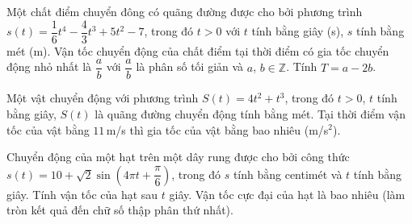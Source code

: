 \begin{ex}%
	Một chất điểm chuyển đông có quãng đường được cho bởi phương trình $s(t)=\dfrac{1}{6}t^4-\dfrac{4}{3}t^3+5t^2-7$, trong đó $t>0$ với $t$ tính bằng giây (s), $s$ tính bằng mét (m). Vận tốc chuyển động của chất điểm tại thời điểm có gia tốc chuyển động nhỏ nhất là $\dfrac{a}{b}$ với $\dfrac{a}{b}$ là phân số tối giản và $a$, $b\in \mathbb{Z}$. Tính $T=a-2b$.
\end{ex}

\begin{ex}%
	Một vật chuyển động với phương trình $S(t)=4t^2+t^3$, trong đó $t>0$, $t$ tính bằng giây, $S(t)$ là quãng đường chuyển động tính bằng mét. Tại thời điểm vận tốc của vật bằng $11$\,m/s thì gia tốc của vật bằng bao nhiêu (m/s$^2$).
\end{ex}

\begin{ex} 	%
	Chuyển động của một hạt trên một dây rung được cho bởi công thức $ s\left( t \right)=10+\sqrt {2}\sin \left( 4\pi t+\dfrac{\pi }{6} \right)$, trong đó $ s$ tính bằng centimét và $ t$ tính bằng giây. Tính vận tốc của hạt sau $ t$ giây. Vận tốc cực đại của hạt là bao nhiêu (làm tròn kết quả đến chữ số thập phân thứ nhất).\\
\end{ex}

